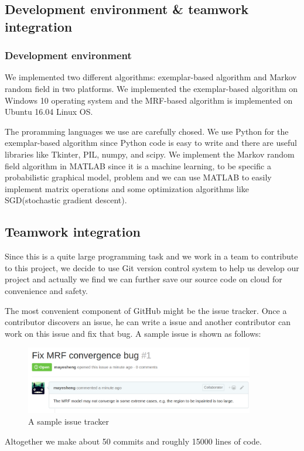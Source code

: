 \subsection{Development environment \& teamwork integration}
\subsubsection{Development environment}
We implemented two different algorithms: exemplar-based algorithm and
Markov random field in two platforms. We implemented the exemplar-based
algorithm on Windows 10 operating system and the MRF-based algorithm is
implemented on Ubuntu 16.04 Linux OS.

The proramming languages we use are carefully chosed. We use Python for
the exemplar-based algorithm since Python code is easy to write and there
are useful libraries like Tkinter, PIL, numpy, and scipy. We implement
the Markov random field algorithm in MATLAB since it is a machine learning,
to be specific a probabilistic graphical model, problem and we can use
MATLAB to easily implement matrix operations and some optimization
algorithms like SGD(stochastic gradient descent).
\subsection{Teamwork integration}
Since this is a quite large programming task and we work in a team to
contribute to this project, we decide to use Git version control system
to help us develop our project and actually we find we can further
save our source code on cloud for convenience and safety.

The most convenient component of GitHub might be the issue tracker. Once
a contributor discovers an issue, he can write a issue and another 
contributor can work on this issue and fix that bug. A sample issue is 
shown as follows:
\begin{figure}
    \centering
    \includegraphics[width=10cm]{sc1.png}
    \caption{A sample issue tracker}
\end{figure}
Altogether we make about 50 commits and roughly 15000 lines of code.
